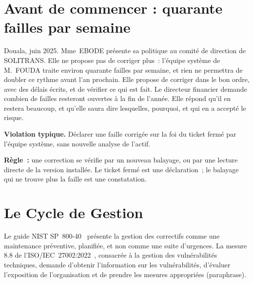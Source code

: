 \section*{Avant de commencer : quarante failles par semaine}

Douala, juin 2025. Mme~EBODE présente sa politique au comité de direction
de SOLITRANS. Elle ne propose pas de corriger plus~: l'équipe système de
M.~FOUDA traite environ quarante failles par semaine, et rien ne permettra
de doubler ce rythme avant l'an prochain. Elle propose de corriger dans le
bon ordre, avec des délais écrits, et de vérifier ce qui est fait. Le
directeur financier demande combien de failles resteront ouvertes à la fin
de l'année. Elle répond qu'il en restera beaucoup, et qu'elle saura dire
lesquelles, pourquoi, et qui en a accepté le risque.

\begin{boxalert}
\textbf{Violation typique.} Déclarer une faille corrigée sur la foi du
ticket fermé par l'équipe système, sans nouvelle analyse de l'actif.

\smallskip
\textbf{Règle~:} une correction se vérifie par un nouveau balayage, ou par
une lecture directe de la version installée. Le ticket fermé est une
déclaration~; le balayage qui ne trouve plus la faille est une constatation.
\end{boxalert}

\separateur

\section{Le Cycle de Gestion}
\label{sec:c11-cycle}

Le guide NIST SP~800-40~\cite{nist80040} présente la gestion des correctifs
comme une maintenance préventive, planifiée, et non comme une suite
d'urgences. La mesure 8.8 de l'ISO/IEC~27002:2022~\cite{iso27002_2022},
consacrée à la gestion des vulnérabilités techniques, demande d'obtenir
l'information sur les vulnérabilités, d'évaluer l'exposition de
l'organisation et de prendre les mesures appropriées (paraphrase).


